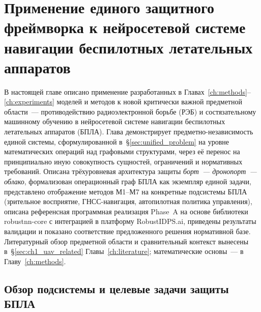 
\chapter{Применение единого защитного фреймворка к нейросетевой системе
навигации беспилотных летательных аппаратов}
\label{ch:uav}

В настоящей главе описано применение разработанных в Главах~\ref{ch:methods}--\ref{ch:experiments} моделей и методов к новой критически важной предметной области~--- противодействию радиоэлектронной борьбе (РЭБ) и состязательному машинному обучению в нейросетевой системе навигации беспилотных летательных аппаратов (БПЛА). Глава демонстрирует предметно-независимость единой системы, сформулированной в~\S\ref{sec:unified_problem} на уровне математических операций над графовыми структурами, через её перенос на принципиально иную совокупность сущностей, ограничений и нормативных требований. Описана трёхуровневая архитектура защиты \emph{борт~--- дронопорт~--- облако}, формализован операционный граф БПЛА как экземпляр единой задачи, представлено отображение методов \textsf{М1}--\textsf{М7} на конкретные подсистемы БПЛА (зрительное восприятие, ГНСС-навигация, автопилотная политика управления), описана референсная программная реализация Phase~A на основе библиотеки \textsf{robustnn-core} с интеграцией в платформу \textsf{RobustIDPS.ai}, приведены результаты валидации и показано соответствие предложенного решения нормативной базе. Литературный обзор предметной области и сравнительный контекст вынесены в~\S\ref{sec:ch1_uav_related} Главы~\ref{ch:literature}; математические основы~--- в Главу~\ref{ch:methods}.


\section{Обзор подсистемы и целевые задачи защиты БПЛА}
\label{sec:uav_overview}

